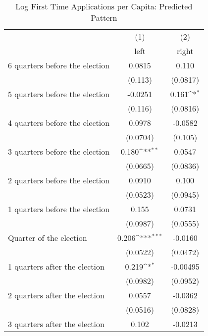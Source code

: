 \begin{table}[htbp]\centering
\def\sym#1{\ifmmode^{#1}\else\(^{#1}\)\fi}
\caption{Log First Time Applications per Capita: Predicted Pattern}
\begin{tabular}{l*{2}{c}}
\hline\hline
                    &\multicolumn{1}{c}{(1)}&\multicolumn{1}{c}{(2)}\\
                    &\multicolumn{1}{c}{left}&\multicolumn{1}{c}{right}\\
\hline
 6 quarters before the election&      0.0815         &       0.110         \\
                    &     (0.113)         &    (0.0817)         \\
[1em]
 5 quarters before the election&     -0.0251         &       0.161\sym{*}  \\
                    &     (0.116)         &    (0.0816)         \\
[1em]
 4 quarters before the election&      0.0978         &     -0.0582         \\
                    &    (0.0704)         &     (0.105)         \\
[1em]
 3 quarters before the election&       0.180\sym{**} &      0.0547         \\
                    &    (0.0665)         &    (0.0836)         \\
[1em]
 2 quarters before the election&      0.0910         &       0.100         \\
                    &    (0.0523)         &    (0.0945)         \\
[1em]
 1 quarters before the election&       0.155         &      0.0731         \\
                    &    (0.0987)         &    (0.0555)         \\
[1em]
Quarter of the election&       0.206\sym{***}&     -0.0160         \\
                    &    (0.0522)         &    (0.0472)         \\
[1em]
 1 quarters after the election&       0.219\sym{*}  &    -0.00495         \\
                    &    (0.0982)         &    (0.0952)         \\
[1em]
 2 quarters after the election&      0.0557         &     -0.0362         \\
                    &    (0.0516)         &    (0.0828)         \\
[1em]
 3 quarters after the election&       0.102         &     -0.0213         \\

\end{tabular}
\end{table}
